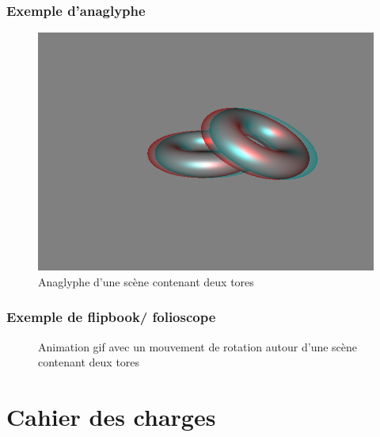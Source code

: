 \documentclass{beamer}
\begin{document}
\begin{frame}

\frametitle{Exemple d'anaglyphe}
\begin{figure}
\centering
\includegraphics[scale=0.38]{donuts_photoshop.png} %
\caption{Anaglyphe d'une scène contenant deux tores}
\end{figure}

\end{frame}




\begin{frame}

\frametitle{Exemple de flipbook/ folioscope}

\begin{figure}
\centering
{}
\caption{Animation gif avec un mouvement de rotation autour d'une scène contenant deux tores}
\end{figure}
\end{frame}

%
\section{Cahier des charges}
\end{document}
